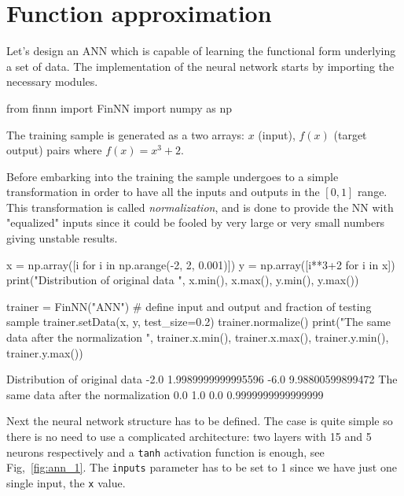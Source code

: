 \section{Function approximation}
\label{function-approximation}

Let's design an ANN which is capable of learning the functional form underlying a set of data. The implementation of the neural network starts by importing the necessary modules.

\begin{ipython}
from finnn import FinNN
import numpy as np
\end{ipython}

The training sample is generated as a two arrays: \(x\) (input), \(f(x)\) (target output) pairs where \(f(x) = x^3 +2\). 

Before embarking into the training the sample undergoes to a simple transformation in order to have all the inputs and outputs in the \([0, 1]\) range. This transformation is called \emph{normalization}, and is done to provide the NN with "equalized" inputs since it could be fooled by very large or very small numbers giving unstable results.

\begin{ipython}
x = np.array([i for i in np.arange(-2, 2, 0.001)])
y = np.array([i**3+2 for i in x])
print("Distribution of original data ", x.min(), x.max(), y.min(), y.max())

trainer = FinNN("ANN")
# define input and output and fraction of testing sample
trainer.setData(x, y, test_size=0.2)
trainer.normalize()
print("The same data after the normalization ", trainer.x.min(),
       trainer.x.max(), trainer.y.min(), trainer.y.max())
\end{ipython}
\begin{ioutput}
Distribution of original data  -2.0 1.9989999999995596 -6.0 9.98800599899472
The same data after the normalization  0.0 1.0 0.0 0.9999999999999999
\end{ioutput}

Next the neural network structure has to be defined. The case is quite simple so there is no need to use a complicated architecture: two layers with 15 and 5 neurons respectively and a \texttt{tanh} activation function is enough, see Fig,~\ref{fig:ann_1}. The \texttt{inputs} parameter has to be set to 1 since we have just one single input, the \texttt{x} value.

